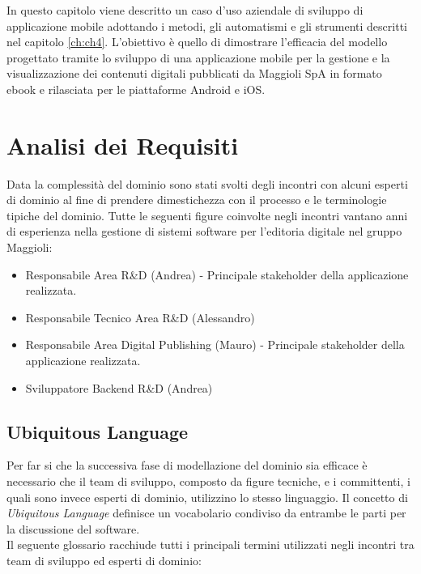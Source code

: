 In questo capitolo viene descritto un caso d'uso aziendale di sviluppo di applicazione mobile adottando i metodi, gli automatismi e gli strumenti descritti nel capitolo \ref{ch:ch4}. L'obiettivo è quello di dimostrare l'efficacia del modello progettato tramite lo sviluppo di una applicazione mobile per la gestione e la visualizzazione dei contenuti digitali pubblicati da Maggioli SpA in formato ebook e rilasciata per le piattaforme Android e iOS.

\section{Analisi dei Requisiti}
Data la complessità del dominio sono stati svolti degli incontri con alcuni esperti di dominio al fine di prendere dimestichezza con il processo e le terminologie tipiche del dominio. Tutte le seguenti figure coinvolte negli incontri vantano anni di esperienza nella gestione di sistemi software per l'editoria digitale nel gruppo Maggioli:
\begin{itemize}
    \item Responsabile Area R\&D (Andrea) - Principale stakeholder della applicazione realizzata.
    \item Responsabile Tecnico Area R\&D (Alessandro)
    \item Responsabile Area Digital Publishing (Mauro) - Principale stakeholder della applicazione realizzata.
    \item Sviluppatore Backend R\&D (Andrea)
\end{itemize}

\subsection{Ubiquitous Language}
Per far si che la successiva fase di modellazione del dominio sia efficace è necessario che il team di sviluppo, composto da figure tecniche, e i committenti, i quali sono invece esperti di dominio, utilizzino lo stesso linguaggio. Il concetto di \textit{Ubiquitous Language} definisce un vocabolario condiviso da entrambe le parti per la discussione del software\cite{evans_domain-driven_2004}.\\
Il seguente glossario racchiude tutti i principali termini utilizzati negli incontri tra team di sviluppo ed esperti di dominio:

